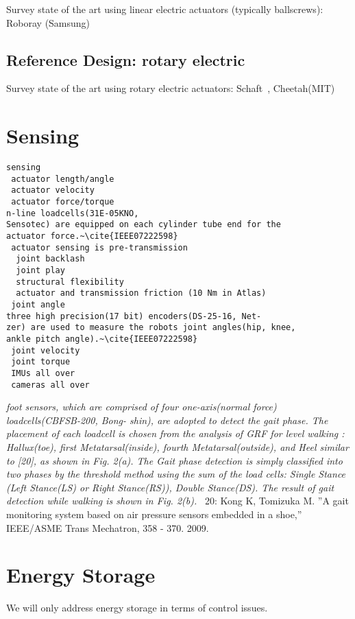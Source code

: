 \documentclass[letterpaper,12pt,fullpage]{article}
\begin{document}
Survey state of the art using linear electric actuators (typically ballscrews):
Roboray (Samsung)

\subsection{Reference Design: rotary electric}

Survey state of the art using rotary electric actuators:
Schaft~\cite{shaft_foot_placement,shaft_push_recov}, Cheetah(MIT)

\section{Sensing}

\begin{verbatim}
sensing
 actuator length/angle
 actuator velocity
 actuator force/torque 
n-line loadcells(31E-05KNO,
Sensotec) are equipped on each cylinder tube end for the
actuator force.~\cite{IEEE07222598}
 actuator sensing is pre-transmission
  joint backlash
  joint play
  structural flexibility
  actuator and transmission friction (10 Nm in Atlas)
 joint angle
three high precision(17 bit) encoders(DS-25-16, Net-
zer) are used to measure the robots joint angles(hip, knee,
ankle pitch angle).~\cite{IEEE07222598}
 joint velocity
 joint torque
 IMUs all over
 cameras all over
\end{verbatim}

{\it foot sensors, which are comprised
of four one-axis(normal force) loadcells(CBFSB-200, Bong-
shin), are adopted to detect the gait phase. The placement
of each loadcell is chosen from the analysis of GRF for
level walking : Hallux(toe), first Metatarsal(inside), fourth
Metatarsal(outside), and Heel similar to [20], as shown in
Fig. 2(a). The Gait phase detection is simply classified
into two phases by the threshold method using the sum
of the load cells: Single Stance (Left Stance(LS) or Right
Stance(RS)), Double Stance(DS). The result of gait detection
while walking is shown in Fig. 2(b).}~\cite{IEEE07222598}
20: Kong K, Tomizuka M. ”A gait monitoring system based on air pressure
sensors embedded in a shoe,” IEEE/ASME Trans Mechatron, 358 - 370.
2009.

\section{Energy Storage}

We will only address energy storage
in terms of control issues.
\end{document}
